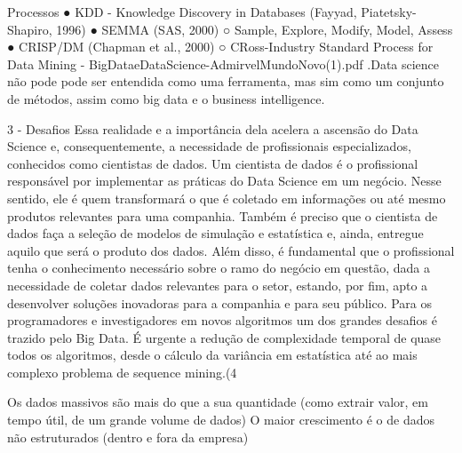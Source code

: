 Processos ● KDD - Knowledge Discovery in Databases (Fayyad, Piatetsky-Shapiro, 1996) ● SEMMA (SAS, 2000) ○ Sample, Explore, Modify, Model, Assess ● CRISP/DM (Chapman et al., 2000) ○ CRoss-Industry Standard Process for Data Mining - BigDataeDataScience-AdmirvelMundoNovo(1).pdf
  .Data science não pode pode ser entendida como uma ferramenta, mas sim como um conjunto de métodos, assim como big data e o business intelligence.

3 - Desafios
Essa realidade e a importância dela acelera a ascensão do Data Science e, consequentemente, a necessidade de profissionais especializados, conhecidos como cientistas de dados.
Um cientista de dados é o profissional responsável por implementar as práticas do Data Science em um negócio. Nesse sentido, ele é quem transformará o que é coletado em informações ou até mesmo produtos relevantes para uma companhia.
Também é preciso que o cientista de dados faça a seleção de modelos de simulação e estatística e, ainda, entregue aquilo que será o produto dos dados. Além disso, é fundamental que o profissional tenha o conhecimento necessário sobre o ramo do negócio em questão, dada a necessidade de coletar dados relevantes para o setor, estando, por fim, apto a desenvolver soluções inovadoras para a companhia e para seu público.
Para os programadores e investigadores em novos algoritmos um dos grandes desafios é trazido pelo Big Data. É urgente a redução de complexidade temporal de quase todos os algoritmos, desde o cálculo da variância em estatística até ao mais complexo problema de sequence mining.(4%

Os dados massivos são mais do que a sua quantidade (como extrair valor, em tempo útil, de um grande volume de dados)
O maior crescimento é o de dados não estruturados (dentro e fora da empresa)

